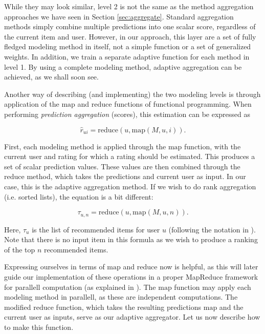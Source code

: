 

While they may look similar, level 2 is not the same as the method aggregation approaches we have seen in Section \ref{sec:aggregate}.
Standard aggregation methods simply combine multiple predictions into one scalar score, regardless of the current item and user.
However, in our approach, this layer are a set of fully fledged modeling method in itself, not a simple function or a set of generalized weights.
In addition, we train a separate adaptive function for each method in level 1.
By using a complete modeling method, adaptive aggregation can be achieved, as we shall soon see.

Another way of describing (and implementing) the two modeling levels is through application
of the $\mathrm{map}$ and $\mathrm{reduce}$ functions of functional programming.
When performing \emph{prediction aggregation} (scores), this estimation can be expressed as

\begin{equation*}
  \hat{r}_{ui} = \mathrm{reduce}(u, \mathrm{map}(M,u,i)).
\end{equation*}

First, each modeling method is applied through the $\mathrm{map}$ function, with the current user and rating for which
a rating should be estimated. This produces a set of scalar prediction values. These values are then
combined through the $\mathrm{reduce}$ method, which takes the predictions and current user as input.
In our case, this is the adaptive aggregation method. 
If we wish to do rank aggregation (i.e. sorted lists), the equation is a bit different:

\begin{equation*}
  \tau_{u,n} = \mathrm{reduce}(u, \mathrm{map}(M,u,n)).
\end{equation*}

Here, $\tau_{u}$ is the list of recommended items for user $u$ (following the notation in \citet[p3]{Dwork2001}).
Note that there is no input item in this formula as we wish to produce a ranking of the top $n$ recommended items.

Expressing ourselves in terms of $\mathrm{map}$ and $\mathrm{reduce}$ now is helpful, as this will later
guide our implementation of these operations in a proper MapReduce framework
for parallell computation (as explained in \citet[p75]{Manning2008}).
The $\mathrm{map}$ function may apply each modeling method in parallell, 
as these are independent computations.
The modified $\mathrm{reduce}$ function, which takes the resulting predictions $\mathrm{map}$ and the current
user as inputs, serve as our adaptive aggregator.
Let us now describe how to make this function.



